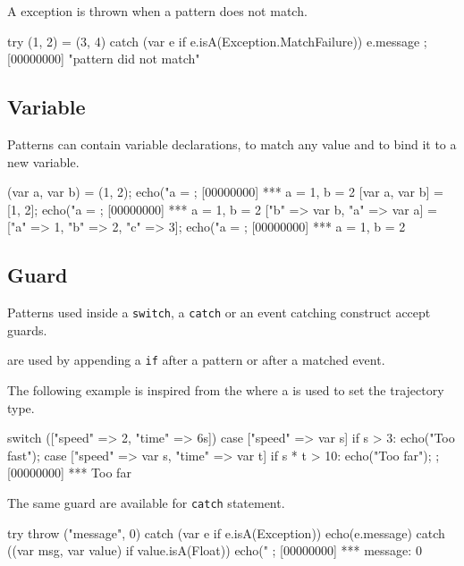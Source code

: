A  exception is thrown when a pattern does
not match.

\begin{urbiscript}
try
{
  (1, 2) = (3, 4)
}
catch (var e if e.isA(Exception.MatchFailure))
{
  e.message
};
[00000000] "pattern did not match"
\end{urbiscript}

\subsection{Variable}

Patterns can contain variable declarations, to match any value and to bind
it to a new variable.

\begin{urbiscript}
{
  (var a, var b) = (1, 2);
  echo("a = %
};
[00000000] *** a = 1, b = 2
{
  [var a, var b] = [1, 2];
  echo("a = %
};
[00000000] *** a = 1, b = 2
{
  ["b" => var b, "a" => var a] = ["a" => 1, "b" => 2, "c" => 3];
  echo("a = %
};
[00000000] *** a = 1, b = 2
\end{urbiscript}

\subsection{Guard}

Patterns used inside a \lstinline{switch}, a \lstinline{catch} or an event
catching construct accept guards.

 are used by appending a \lstinline{if} after a pattern or
after a matched event.

The following example is inspired from the 
where a  is used to set the trajectory type.

\begin{urbiscript}
switch (["speed" => 2, "time" => 6s])
{
  case ["speed" => var s] if s > 3:
    echo("Too fast");
  case ["speed" => var s, "time" => var t] if s * t > 10:
    echo("Too far");
};
[00000000] *** Too far
\end{urbiscript}

The same guard are available for \lstinline{catch} statement.

\begin{urbiscript}
try
{
  throw ("message", 0)
}
catch (var e if e.isA(Exception))
{
  echo(e.message)
}
catch ((var msg, var value) if value.isA(Float))
{
  echo("%
};
[00000000] *** message: 0
\end{urbiscript}

